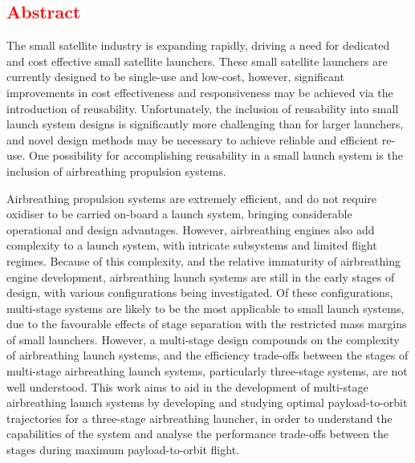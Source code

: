 \cleardoublepage
\textcolor{red}{
\section*{Abstract}
}
\noindent
 The small satellite industry is expanding rapidly, driving a need for dedicated and cost effective small satellite launchers.  
These small satellite launchers are currently designed to be single-use and low-cost, however, significant improvements in cost effectiveness and responsiveness may be achieved via the introduction of reusability. Unfortunately, the inclusion of reusability into small launch system designs is significantly more challenging than for larger launchers, and novel design methods may be necessary to achieve reliable and efficient re-use. One possibility for accomplishing reusability in a small launch system is the inclusion of airbreathing propulsion systems.

Airbreathing propulsion systems are extremely efficient, and do not require oxidiser to be carried on-board a launch system, bringing considerable operational and design advantages. 
However, airbreathing engines also add complexity to a launch system, with intricate subsystems and limited flight regimes. Because of this complexity, and the relative immaturity of airbreathing engine development, airbreathing launch systems are still in the early stages of design, with various configurations being investigated. Of these configurations, multi-stage systems are likely to be the most applicable to small launch systems, due to the favourable effects of stage separation with the restricted mass margins of small launchers. However, a multi-stage design compounds on the complexity of airbreathing launch systems, and the efficiency trade-offs between the stages of multi-stage airbreathing launch systems, particularly three-stage systems, are not well understood. This work aims to aid in the development of multi-stage airbreathing launch systems by developing and studying optimal payload-to-orbit trajectories for a three-stage airbreathing launcher, in order to understand the capabilities of the system and analyse the performance trade-offs between the stages during maximum payload-to-orbit flight.



